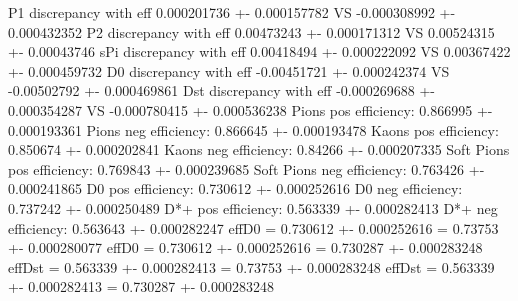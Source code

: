 P1 discrepancy with eff 0.000201736 +- 0.000157782 VS -0.000308992 +- 0.000432352
P2 discrepancy with eff 0.00473243 +- 0.000171312 VS 0.00524315 +- 0.00043746
sPi discrepancy with eff 0.00418494 +- 0.000222092 VS 0.00367422 +- 0.000459732
D0 discrepancy with eff -0.00451721 +- 0.000242374 VS -0.00502792 +- 0.000469861
Dst discrepancy with eff -0.000269688 +- 0.000354287 VS -0.000780415 +- 0.000536238
Pions pos efficiency: 0.866995 +- 0.000193361
Pions neg efficiency: 0.866645 +- 0.000193478
Kaons pos efficiency: 0.850674 +- 0.000202841
Kaons neg efficiency: 0.84266 +- 0.000207335
Soft Pions pos efficiency: 0.769843 +- 0.000239685
Soft Pions neg efficiency: 0.763426 +- 0.000241865
D0 pos efficiency: 0.730612 +- 0.000252616
D0 neg efficiency: 0.737242 +- 0.000250489
D*+ pos efficiency: 0.563339 +- 0.000282413
D*+ neg efficiency: 0.563643 +- 0.000282247
effD0 = 0.730612 +- 0.000252616 = 0.73753 +- 0.000280077
effD0 = 0.730612 +- 0.000252616 = 0.730287 +- 0.000283248
effDst = 0.563339 +- 0.000282413 = 0.73753 +- 0.000283248
effDst = 0.563339 +- 0.000282413 = 0.730287 +- 0.000283248